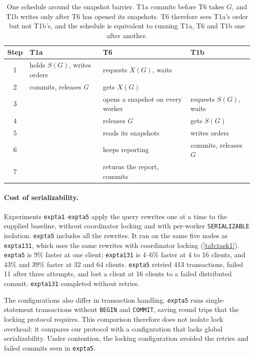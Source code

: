 \documentclass[sigconf,10pt,nonacm]{acmart}
\newcommand{\expt}[1]{\texttt{expt\textunderscore #1}}
\renewcommand{\_}{\underscorewithoutbreak\allowbreak}
\begin{document}
\begin{table}[t]
\caption{One schedule around the snapshot barrier. T1a commits before T6 takes $G$, and
T1b writes only after T6 has opened its snapshots. T6 therefore sees T1a's order but
not T1b's, and the schedule is equivalent to running T1a, T6 and T1b one after
another.}
\label{tab:barrier}
\footnotesize
\setlength{\tabcolsep}{3pt}
\begin{tabular}{@{}c L{0.27\columnwidth} L{0.27\columnwidth} L{0.27\columnwidth}@{}}
\toprule
Step & T1a & T6 & T1b \\
 & holds $S(G)$, writes orders & requests $X(G)$, waits & \\
2 & commits, releases $G$ & gets $X(G)$ & \\
3 & & opens a snapshot on every worker & requests $S(G)$, waits \\
4 & & releases $G$ & gets $S(G)$ \\
5 & & reads its snapshots & writes orders \\
6 & & keeps reporting & commits, releases $G$ \\
7 & & returns the report, commits & \\
\bottomrule
\end{tabular}
\end{table}

\paragraph{Cost of serializability.} Experiments \expt{a1}--\expt{a5} apply the
query rewrites one at a time to the supplied baseline, without coordinator locking
and with per-worker \texttt{SERIALIZABLE} isolation. \expt{a5} includes all the
rewrites. It ran on the same five nodes as \expt{a131}, which uses the same
rewrites with coordinator locking (\cref{tab:task1}). \expt{a5} is 9\% faster at
one client; \expt{a131} is 4--6\% faster at 4 to 16 clients, and 43\% and 39\%
faster at 32 and 64 clients. \expt{a5} retried 413 transactions, failed 11 after
three attempts, and lost a client at 16 clients to a failed distributed commit.
\expt{a131} completed without retries.

The configurations also differ in transaction handling. \expt{a5} runs
single-statement transactions without \texttt{BEGIN} and \texttt{COMMIT}, saving
round trips that the locking protocol requires. This comparison therefore does
not isolate lock overhead: it compares our protocol with a configuration that
lacks global serializability. Under contention, the locking configuration avoided
the retries and failed commits seen in \expt{a5}.
\end{document}
